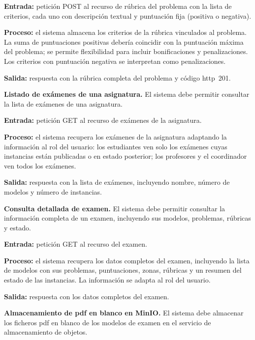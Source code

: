 \begin{functional}
    \textbf{Entrada:} petición POST al recurso de rúbrica del problema con la lista de
    criterios, cada uno con descripción textual y puntuación fija (positiva o negativa).

    \textbf{Proceso:} el sistema almacena los criterios de la rúbrica vinculados al
    problema. La suma de puntuaciones positivas debería coincidir con la puntuación máxima
    del problema; se permite flexibilidad para incluir bonificaciones y penalizaciones. Los
    criterios con puntuación negativa se interpretan como penalizaciones.

    \textbf{Salida:} respuesta con la rúbrica completa del problema y código
    \acs{http}~201.

    \item \textbf{Listado de exámenes de una asignatura.} \label{rf:exams:list}
    El sistema debe permitir consultar la lista de exámenes de una asignatura.

    \textbf{Entrada:} petición GET al recurso de exámenes de la asignatura.

    \textbf{Proceso:} el sistema recupera los exámenes de la asignatura adaptando la
    información al rol del usuario: los estudiantes ven solo los exámenes cuyas instancias
    están publicadas o en estado posterior; los profesores y el coordinador ven todos los
    exámenes.

    \textbf{Salida:} respuesta con la lista de exámenes, incluyendo nombre, número de
    modelos y número de instancias.

    \item \textbf{Consulta detallada de examen.} \label{rf:exams:detail}
    El sistema debe permitir consultar la información completa de un examen, incluyendo sus
    modelos, problemas, rúbricas y estado.

    \textbf{Entrada:} petición GET al recurso del examen.

    \textbf{Proceso:} el sistema recupera los datos completos del examen, incluyendo la
    lista de modelos con sus problemas, puntuaciones, zonas, rúbricas y un resumen del
    estado de las instancias. La información se adapta al rol del usuario.

    \textbf{Salida:} respuesta con los datos completos del examen.

    \item \textbf{Almacenamiento de \acs{pdf} en blanco en MinIO.}
    \label{rf:exams:blank_pdf_storage}
    El sistema debe almacenar los ficheros \acs{pdf} en blanco de los modelos de examen en
    el servicio de almacenamiento de objetos.


\end{functional}
